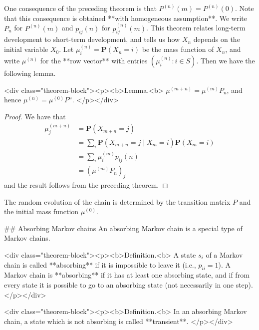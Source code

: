 One consequence of the preceding theorem is that $P^{(n)}(m) = P^{(n)}(0)$. Note that this consequence is obtained **with homogeneous assumption**. We write $P_n$ for $P^{(n)}(m)$ and $p_{ij}(n)$ for $p_{ij}^{(n)}(m)$. This theorem relates long-term development to short-term development, and tells us how $X_n$ depends on the initial variable $X_0$. Let $\mu_i^{(n)} = \mathbf{P}(X_n = i)$ be the mass function of $X_n$, and write $\mu^{(n)}$ for the **row vector** with entries $(\mu_i^{(n)} : i \in S)$. Then we have the following lemma.

<div class="theorem-block"><p><b>Lemma.<b> 
$\mu^{(m+n)} = \mu^{(m)}P_n$, and hence $\mu^{(n)} = \mu^{(0)}P^n$.
</p></div>

\begin{proof}
    We have that
    $$\begin{equation}
        \begin{split}
            \mu_j^{(m+n)} &= \mathbf{P}(X_{m+n} = j) \\
            &= \sum_{i} \mathbf{P}(X_{m+n} = j \;\vert\; X_m = i) \mathbf{P}(X_m = i) \\
            &= \sum_{i} \mu_i^{(m)} p_{ij}(n) \\
            &= (\mu^{(m)} P_n)_j
        \end{split}
    \end{equation}$$
    and the result follows from the preceding theorem.
\end{proof}

The random evolution of the chain is determined by the transition matrix $P$ and the initial mass function $\mu^{(0)}$.


## Absorbing Markov chains
An absorbing Markov chain is a special type of Markov chains.

<div class="theorem-block"><p><b>Definition.<b> 
A state $s_i$ of a Markov chain is called **absorbing** if it is impossible to leave it (i.e., $p_{ii} = 1$). A Markov chain is **absorbing** if it has at least one absorbing state, and if from every state it is possible to go to an absorbing state (not necessarily in one step).
</p></div>

<div class="theorem-block"><p><b>Definition.<b> 
In an absorbing Markov chain, a state which is not absorbing is called **transient**.
</p></div>

